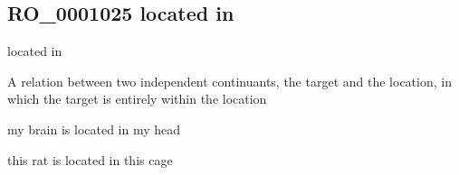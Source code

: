\documentclass[letterpaper,10pt,english]{sphinxmanual}
\begin{document}
\begin{sphinxShadowBox}

\sphinxAtStartPar
{}
\end{sphinxShadowBox}
\begin{quote}

\ignorespaces \end{quote}


\subsection{RO\_0001025 \sphinxhyphen{} located in}
\label{\detokenize{doc-RO_0001025:ro-0001025-located-in}}\label{\detokenize{doc-RO_0001025:index-0}}\label{\detokenize{doc-RO_0001025::doc}}
\begin{sphinxShadowBox}

\sphinxAtStartPar
located in
\end{sphinxShadowBox}

\begin{sphinxShadowBox}

\sphinxAtStartPar
{}
\end{sphinxShadowBox}

\begin{sphinxShadowBox}

\sphinxAtStartPar
A relation between two independent continuants, the target and the location, in which the target is entirely within the location
\end{sphinxShadowBox}

\begin{sphinxShadowBox}

\sphinxAtStartPar
my brain is located in my head

\sphinxAtStartPar
this rat is located in this cage
\end{sphinxShadowBox}
\end{document}
